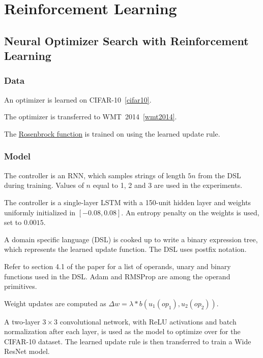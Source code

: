\documentclass[a4paper, 12pt]{article}
\begin{document}
\section{Reinforcement Learning}

\subsection{Neural Optimizer Search with Reinforcement
            Learning~\cite{neural-optimizer-search-46114}}

\subsubsection{Data}

An optimizer is learned on CIFAR-10~\ref{cifar10}.

The optimizer is transferred to WMT~2014~\ref{wmt2014}.

The \href{https://en.wikipedia.org/wiki/Rosenbrock_function}{Rosenbrock
function} is trained on using the learned update rule.

\subsubsection{Model}


The controller is an RNN, which samples strings of length $5n$ from the DSL
during training. Values of $n$ equal to 1, 2 and 3 are used in the experiments.

The controller is a single-layer LSTM with a \num{150}-unit hidden layer and
weights uniformly initialized in $[-0.08, 0.08]$. An entropy penalty on the
weights is used, set to $0.0015$.

A domain specific language (DSL) is cooked up to write a binary expression
tree, which represents the learned update function. The DSL uses postfix
notation.

Refer to section 4.1 of the paper for a list of operands, unary and binary
functions used in the DSL\@. Adam and RMSProp are among the operand primitives.

Weight updates are computed as
$\Delta w = \lambda * b(u_1({op}_1), u_2({op}_2))$.

A two-layer $3 \times 3$ convolutional network, with ReLU activations and batch
normalization after each layer, is used as the model to optimize over for the
CIFAR-10 dataset. The learned update rule is then transferred to train a Wide
ResNet model.
\end{document}
